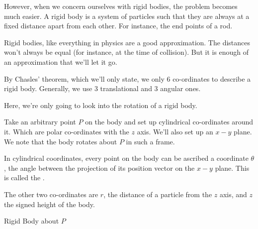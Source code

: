 However, when we concern ourselves with rigid bodies, the problem becomes
much easier. A rigid body is a system of particles such that they are 
always at a fixed distance apart from each other. For instance, 
the end points of a rod.

Rigid bodies, like everything in physics are a good approximation. 
The distances won't always be equal (for instance, at the time of collision).
But it is enough of an approximation that we'll let it go.

By Chasles' theorem, which we'll only state, we only \(6\) co-ordinates to 
describe a rigid body. Generally, we use \(3\) translational and \(3\) angular
ones.

Here, we're only going to look into the rotation of a rigid body.

Take an arbitrary point \(P\) on the body and set up cylindrical co-ordinates around it.
Which are polar co-ordinates with the \(z\) axis. We'll also set up an \(x-y\)
plane.
We note that the body rotates about \(P\) in such a frame.


In cylindrical coordinates, every point on the body can be ascribed a
coordinate \(\theta\), the angle between the projection of its position vector on the 
\(x-y\) plane. This is called the .

The other two co-ordinates are \(r\), the distance of a particle from the 
\(z\) axis, and \(z\) the signed height of the body.

\begin{marginfigure}
    \centering
    \caption{Rigid Body about \(P\)}
\end{marginfigure}

